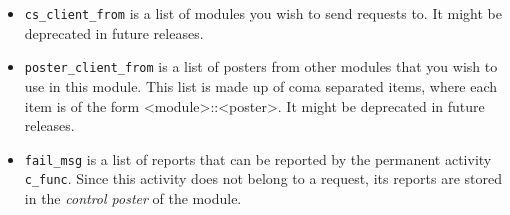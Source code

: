\begin{itemize}
\item {\tt cs\_client\_from} is a list of modules you wish to send
requests to. It might be deprecated in future releases.

\item {\tt poster\_client\_from} is a list of posters from other modules
that  you wish  to use  in this  module.  This list is   made  up of coma
separated items,  where each item is  of the  form <module>::<poster>. It
might be deprecated in future releases.

\item {\tt fail\_msg} is a list of reports that can be reported by the
permanent activity {\tt c\_func}. Since  this activity does not belong to
a request, its  reports are  stored in  the  {\em control poster} of  the
module.
\end{itemize}
